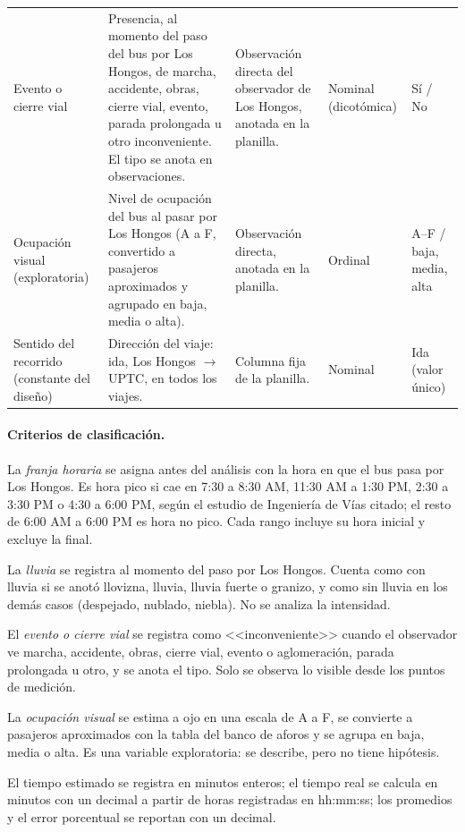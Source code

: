 \begin{table}[htbp]
\begin{tabular}{p{2.3cm} p{4.5cm} p{3.4cm} p{2.2cm} p{1.8cm}}
\addlinespace
Evento o cierre vial &
Presencia, al momento del paso del bus por Los Hongos, de marcha, accidente, obras, cierre vial, evento, parada prolongada u otro inconveniente. El tipo se anota en observaciones. &
Observación directa del observador de Los Hongos, anotada en la planilla. &
Nominal (dicotómica) & Sí / No \\
\addlinespace
Ocupación visual (exploratoria) &
Nivel de ocupación del bus al pasar por Los Hongos (A a F, convertido a pasajeros aproximados y agrupado en baja, media o alta). &
Observación directa, anotada en la planilla. &
Ordinal & A--F / baja, media, alta \\
\addlinespace
Sentido del recorrido (constante del diseño) &
Dirección del viaje: ida, Los Hongos $\rightarrow$ UPTC, en todos los viajes. &
Columna fija de la planilla. &
Nominal & Ida (valor único) \\
\bottomrule
\end{tabular}
\end{table}

\paragraph{Criterios de clasificación.}
La \emph{franja horaria} se asigna antes del análisis con la hora en que el bus pasa por Los Hongos. Es hora pico si cae en 7:30 a 8:30 AM, 11:30 AM a 1:30 PM, 2:30 a 3:30 PM o 4:30 a 6:00 PM, según el estudio de Ingeniería de Vías citado; el resto de 6:00 AM a 6:00 PM es hora no pico. Cada rango incluye su hora inicial y excluye la final.

La \emph{lluvia} se registra al momento del paso por Los Hongos. Cuenta como con lluvia si se anotó llovizna, lluvia, lluvia fuerte o granizo, y como sin lluvia en los demás casos (despejado, nublado, niebla). No se analiza la intensidad.

El \emph{evento o cierre vial} se registra como <<inconveniente>> cuando el observador ve marcha, accidente, obras, cierre vial, evento o aglomeración, parada prolongada u otro, y se anota el tipo. Solo se observa lo visible desde los puntos de medición.

La \emph{ocupación visual} se estima a ojo en una escala de A a F, se convierte a pasajeros aproximados con la tabla del banco de aforos y se agrupa en baja, media o alta. Es una variable exploratoria: se describe, pero no tiene hipótesis.

El tiempo estimado se registra en minutos enteros; el tiempo real se calcula en minutos con un decimal a partir de horas registradas en hh:mm:ss; los promedios y el error porcentual se reportan con un decimal.

